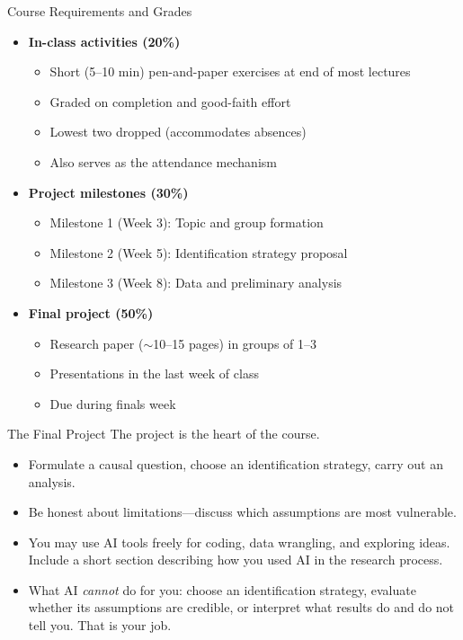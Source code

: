 \documentclass[xcolor=dvipsnames]{beamer}
\newcommand\makebiggaps{\addtolength{\itemsep}{.5\baselineskip}}
\begin{document}
\begin{frame}{Course Requirements and Grades}
\begin{itemize}
\makebiggaps
\item<1-> \textbf{In-class activities (20\%)}
  \begin{itemize}
  \item Short (5--10 min) pen-and-paper exercises at end of most lectures
  \item Graded on completion and good-faith effort
  \item Lowest two dropped (accommodates absences)
  \item Also serves as the attendance mechanism
  \end{itemize}
\medskip
\item<2-> \textbf{Project milestones (30\%)}
  \begin{itemize}
  \item Milestone 1 (Week 3): Topic and group formation
  \item Milestone 2 (Week 5): Identification strategy proposal
  \item Milestone 3 (Week 8): Data and preliminary analysis
  \end{itemize}
\medskip
\item<3-> \textbf{Final project (50\%)}
  \begin{itemize}
  \item Research paper ($\sim$10--15 pages) in groups of 1--3
  \item Presentations in the last week of class
  \item Due during finals week
  \end{itemize}
\end{itemize}
\end{frame}


\begin{frame}{The Final Project}
\small
{} The project is the heart of the course.\\
\medskip
\begin{itemize}
\item<2-> Formulate a causal question, choose an identification strategy, carry out an analysis.
\medskip
\item<3-> Be honest about limitations---discuss which assumptions are most vulnerable.
\medskip
\item<4-> You may use AI tools freely for coding, data wrangling, and exploring ideas. Include a short section describing how you used AI in the research process.
\medskip
\item<5-> What AI \textit{cannot} do for you: choose an identification strategy, evaluate whether its assumptions are credible, or interpret what results do and do not tell you. That is your job.
\end{itemize}
\end{frame}
\end{document}
